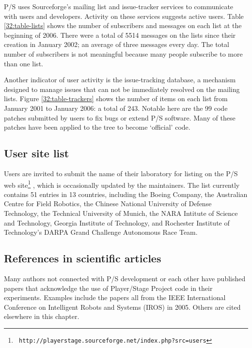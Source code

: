 P/S uses Sourceforge's mailing list and issue-tracker services to
communicate with users and developers. Activity on these services
suggests active users. Table \ref{32:table-lists} shows the number of
subscribers and messages on each list at the beginning of 2006.  There
were a total of 5514 messages on the lists since their creation
in January 2002; an average of three messages every day. The total
number of subscribers is not meaningful because many people subscribe
to more than one list.

Another indicator of user activity is the issue-tracking database, a
mechanism designed to manage issues that can not be immediately
resolved on the mailing lists. Figure \ref{32:table-trackers} shows
the number of items on each list from January 2001 to January 2006: a
total of 243. Notable here are the 99 code patches submitted by users
to fix bugs or extend P/S software. Many of these patches have been
applied to the tree to become `official' code.

\subsection{User site list}
Users are invited to submit the name of their laboratory for listing
on the P/S web site\footnote{\tt
http://playerstage.sourceforge.net/index.php?src=users} , which is
occasionally updated by the maintainers. The list currently contains
51 entries in 13 countries, including the Boeing Company, the
Australian Centre for Field Robotics, the Chinese National University
of Defense Technology, the Technical University of Munich, the NARA
Intitute of Science and Technology, Georgia Institute of Technology,
and Rochester Institute of Technology's DARPA Grand Challenge
Autonomous Race Team.

\subsection{References in scientific articles} 

Many authors not connected with P/S development or each other have
published papers that acknowledge the use of Player/Stage Project code
in their experiments. Examples include the papers
\cite{32_alankus05,32_haasch05,32_topp05,32_shao05} all 
from the IEEE International Conference on Intelligent Robots and
Systems (IROS) in 2005. Others are cited elsewhere in this chapter.


